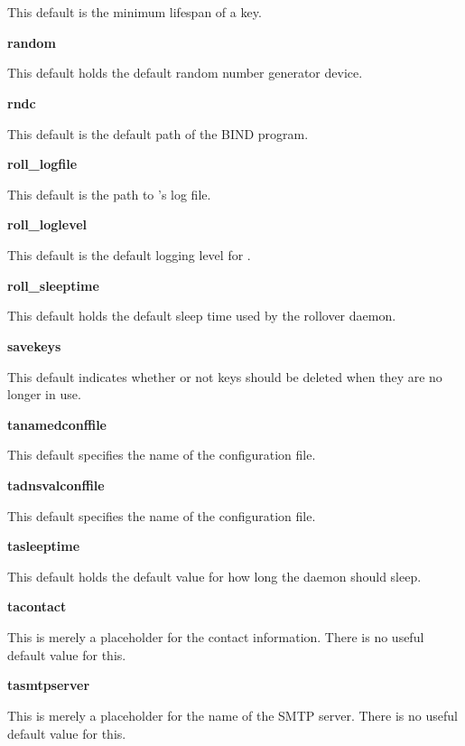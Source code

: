 \begin{description}
This default is the minimum lifespan of a key.

\item {\bf random}\verb" "

This default holds the default random number generator device.

\item {\bf rndc}\verb" "

This default is the default path of the BIND  program.

\item {\bf roll\_logfile}\verb" "

This default is the path to 's log file.

\item {\bf roll\_loglevel}\verb" "

This default is the default logging level for .

\item {\bf roll\_sleeptime}\verb" "

This default holds the default sleep time used by the  rollover
daemon.

\item {\bf savekeys}\verb" "

This default indicates whether or not keys should be deleted when they are no
longer in use.

\item {\bf tanamedconffile}\verb" "

This default specifies the name of the  configuration file.

\item {\bf tadnsvalconffile}\verb" "

This default specifies the name of the  configuration file.

\item {\bf tasleeptime}\verb" "

This default holds the default value for how long the daemon should sleep.

\item {\bf tacontact}\verb" "

This is merely a placeholder for the contact information. There is no useful
default value for this.

\item {\bf tasmtpserver}\verb" "

This is merely a placeholder for the name of the SMTP server. There is no
useful default value for this.


\end{description}
